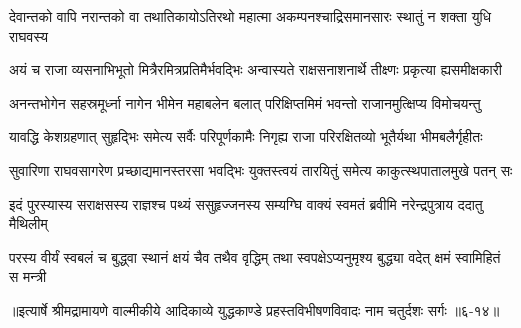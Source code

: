 \twolineshloka
{देवान्तको वापि नरान्तको वा तथातिकायोऽतिरथो महात्मा}
{अकम्पनश्चाद्रिसमानसारः स्थातुं न शक्ता युधि राघवस्य} %

\twolineshloka
{अयं च राजा व्यसनाभिभूतो मित्रैरमित्रप्रतिमैर्भवद्भिः}
{अन्वास्यते राक्षसनाशनार्थे तीक्ष्णः प्रकृत्या ह्यसमीक्षकारी} %

\twolineshloka
{अनन्तभोगेन सहस्रमूर्ध्ना नागेन भीमेन महाबलेन}
{बलात् परिक्षिप्तमिमं भवन्तो राजानमुत्क्षिप्य विमोचयन्तु} %

\twolineshloka
{यावद्धि केशग्रहणात् सुहृद्भिः समेत्य सर्वैः परिपूर्णकामैः}
{निगृह्य राजा परिरक्षितव्यो भूतैर्यथा भीमबलैर्गृहीतः} %

\twolineshloka
{सुवारिणा राघवसागरेण प्रच्छाद्यमानस्तरसा भवद्भिः}
{युक्तस्त्वयं तारयितुं समेत्य काकुत्स्थपातालमुखे पतन् सः} %

\twolineshloka
{इदं पुरस्यास्य सराक्षसस्य राज्ञश्च पथ्यं ससुहृज्जनस्य}
{सम्यग्घि वाक्यं स्वमतं ब्रवीमि नरेन्द्रपुत्राय ददातु मैथिलीम्} %

\twolineshloka
{परस्य वीर्यं स्वबलं च बुद्ध्वा स्थानं क्षयं चैव तथैव वृद्धिम्}
{तथा स्वपक्षेऽप्यनुमृश्य बुद्ध्या वदेत् क्षमं स्वामिहितं स मन्त्री} %


॥इत्यार्षे श्रीमद्रामायणे वाल्मीकीये आदिकाव्ये युद्धकाण्डे प्रहस्तविभीषणविवादः नाम चतुर्दशः सर्गः ॥६-१४॥
